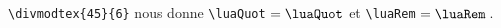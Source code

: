 \documentclass[border = 3pt]{standalone}
\begin{document}

\verb+\divmodtex{45}{6}+ nous donne
\verb+\luaQuot+${} = \luaQuot$
et
\verb+\luaRem+${} = \luaRem$\,.
\end{document}
